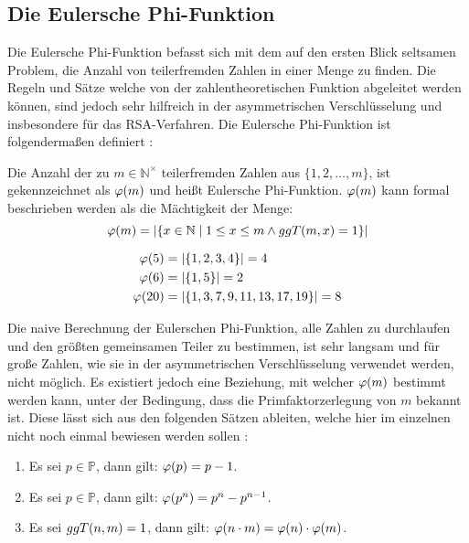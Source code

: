 \subsection{Die Eulersche Phi-Funktion}
Die Eulersche Phi-Funktion befasst sich mit dem auf den ersten Blick seltsamen
Problem, die Anzahl von teilerfremden Zahlen in einer Menge zu finden. Die Regeln
und Sätze welche von der zahlentheoretischen Funktion abgeleitet werden können, sind jedoch sehr
hilfreich in der asymmetrischen Verschlüsselung und insbesondere für das
RSA-Verfahren. Die Eulersche Phi-Funktion ist folgendermaßen definiert
\parencite[165]{BOOK:crypto} \parencite{SITE:phi-euler-fermat}:

\begin{definition}
  Die Anzahl der zu $m \in \mathbb{N}^\times$ teilerfremden Zahlen aus $\{1,2,\dots,m\}$,
  ist gekennzeichnet als $\varphi(m)$ und heißt Eulersche Phi-Funktion. $\varphi(m)$
  kann formal beschrieben werden als die Mächtigkeit der Menge:
  \begin{equation*}
    \varphi(m) = \vert \{x \in \mathbb{N} \mid 1 \leq x \leq m \wedge ggT(m,x) = 1 \} \vert
  \end{equation*}
\end{definition}

\begin{example}
  \begin{align*}
    \varphi(5)  & = \vert \{1,2,3,4\} \vert = 4             \\
    \varphi(6)  & = \vert \{1,5\} \vert = 2                 \\
    \varphi(20) & = \vert \{1,3,7,9,11,13,17,19\} \vert = 8
  \end{align*}
\end{example}

\noindent
Die naive Berechnung der Eulerschen Phi-Funktion, alle Zahlen zu durchlaufen und den
größten gemeinsamen Teiler zu bestimmen, ist sehr langsam und für große Zahlen, wie sie
in der asymmetrischen Verschlüsselung verwendet werden, nicht möglich. Es existiert jedoch
eine Beziehung, mit welcher $\varphi(m)$ bestimmt werden kann, unter der
Bedingung, dass die Primfaktorzerlegung von $m$ bekannt ist. Diese lässt sich aus
den folgenden Sätzen ableiten, welche hier im einzelnen nicht noch einmal bewiesen werden
sollen \parencite{SITE:phi-euler-fermat}:
\begin{enumerate}[ref=(\arabic*)]
  \item Es sei $p \in \mathbb{P}$, dann gilt: $\varphi(p) = p - 1$. \label{enum:phi1}
  \item Es sei $p \in \mathbb{P}$, dann gilt: $\varphi(p^n) = p^n - p^{n-1}$. \label{enum:phi2}
  \item Es sei $ggT(n,m) = 1$, dann gilt:
        $\varphi(n \cdot m) = \varphi(n) \cdot \varphi(m)$. \label{enum:phi3}
\end{enumerate}

